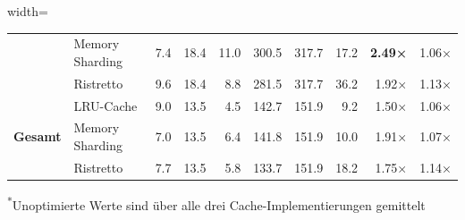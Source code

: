 \begin{table}[htbp]
\begin{adjustbox}{width=\textwidth}
\begin{tabular}{@{}llrrrrrrrr@{}}
  & Memory Sharding & 7.4 & 18.4 & 11.0 & 300.5 & 317.7 & 17.2 & \textbf{2.49×} & 1.06× \\
  & Ristretto & 9.6 & 18.4 & 8.8 & 281.5 & 317.7 & 36.2 & 1.92× & 1.13× \\
\midrule
\midrule
 \multirow{3}{*}{\textbf{Gesamt}} & LRU-Cache & 9.0 & 13.5 & 4.5 & 142.7 & 151.9 & 9.2 & 1.50× & 1.06× \\
  & Memory Sharding & 7.0 & 13.5 & 6.4 & 141.8 & 151.9 & 10.0 & 1.91× & 1.07× \\
  & Ristretto & 7.7 & 13.5 & 5.8 & 133.7 & 151.9 & 18.2 & 1.75× & 1.14× \\
\bottomrule
\end{tabular}
\end{adjustbox}
\footnotesize{\textsuperscript{*}Unoptimierte Werte sind über alle drei Cache-Implementierungen gemittelt}
\end{table}